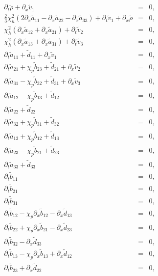 \documentclass[
10pt, %
a4paper, %
oneside, %
headinclude,footinclude, %
table
]{scrartcl}
\begin{document}
$$
\begin{array}{rcl}
\partial_{t}{\tilde{\rho }}+\partial_{x}{\tilde{v}_1}&=&0,\\   
\frac{2}{3} \chi _h^2 \left(2   \partial_{x}{\tilde{a}_{11}}-\partial_{x}{\tilde{a}_{22}}-\partial_{x}{\tilde{a}_{33}}\right)+\partial_{t}{\tilde{v}_1}+\partial_{x}{\tilde{\rho }}&=&0,\\   
\chi _h^2   \left(\partial_{x}{\tilde{a}_{12}}+\partial_{x}{\tilde{a}_{21}}\right)+\partial_{t}{\tilde{v}_2}&=&0,\\   
\chi_h^2\left(\partial_{x}{\tilde{a}_{13}}+\partial_{x}{\tilde{a}_{31}}\right)+\partial_{t}{\tilde{v}_3}&=&0,\\   
\partial_{t}{\tilde{a}_{11}}+\tilde{d}_{11}+\partial_{x}{\tilde{v}_1}&=&0,\\   
\partial_{t}{\tilde{a}_{21}}+\chi _p\tilde{b}_{23} +\tilde{d}_{21}+\partial_{x}{\tilde{v}_2}&=&0,\\   
\partial_{t}{\tilde{a}_{31}}-\chi _p\tilde{b}_{32}+\tilde{d}_{31}+\partial_{x}{\tilde{v}_3}&=&0,\\   
\partial_{t}{\tilde{a}_{12}}-\chi_p\tilde{b}_{13} +\tilde{d}_{12}&=&0,\\   
\partial_{t}{\tilde{a}_{22}}+\tilde{d}_{22}&=&0,\\   
\partial_{t}{\tilde{a}_{32}}+\chi _p\tilde{b}_{31} +\tilde{d}_{32}&=&0,\\   
\partial_{t}{\tilde{a}_{13}}+\chi_p\tilde{b}_{12} +\tilde{d}_{13}&=&0,\\   
\partial_{t}{\tilde{a}_{23}}-\chi_p\tilde{b}_{21} +\tilde{d}_{23}&=&0,\\   
\partial_{t}{\tilde{a}_{33}}+\tilde{d}_{33}&=&0,\\   
\partial_{t}{\tilde{b}_{11}}&=&0,\\   
\partial_{t}{\tilde{b}_{21}}&=&0,\\   
\partial_{t}{\tilde{b}_{31}}&=&0,\\   
\partial_{t}{\tilde{b}_{12}}-\chi _p\partial_{x}{\tilde{b}_{12}}-\partial_{x}{\tilde{d}_{13}}&=&0,\\   
\partial_{t}{\tilde{b}_{22}}+\chi _p\partial_{x}{\tilde{b}_{21}}-\partial_{x}{\tilde{d}_{23}}&=&0,\\   
\partial_{t}{\tilde{b}_{32}}-\partial_{x}{\tilde{d}_{33}}&=&0,\\   
\partial_{t}{\tilde{b}_{13}}-\chi _p\partial_{x}{\tilde{b}_{13}}+\partial_{x}{\tilde{d}_{12}}&=&0,\\   
\partial_{t}{\tilde{b}_{23}}+\partial_{x}{\tilde{d}_{22}}&=&0,\\   

\end{array}$$
\end{document}
